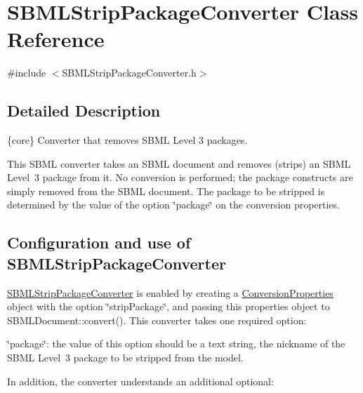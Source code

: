 \hypertarget{class_s_b_m_l_strip_package_converter}{}\section{S\+B\+M\+L\+Strip\+Package\+Converter Class Reference}
\label{class_s_b_m_l_strip_package_converter}


{\ttfamily \#include $<$S\+B\+M\+L\+Strip\+Package\+Converter.\+h$>$}



\subsection{Detailed Description}
\{core\} Converter that removes S\+B\+ML Level 3 packages.



This S\+B\+ML converter takes an S\+B\+ML document and removes (strips) an S\+B\+ML Level~3 package from it. No conversion is performed; the package constructs are simply removed from the S\+B\+ML document. The package to be stripped is determined by the value of the option {\ttfamily \char`\"{}package\char`\"{}} on the conversion properties.\hypertarget{class_s_b_m_l_strip_package_converter_SBMLStripPackageConverter-usage}{}\subsection{Configuration and use of S\+B\+M\+L\+Strip\+Package\+Converter}\label{class_s_b_m_l_strip_package_converter_SBMLStripPackageConverter-usage}
\hyperlink{class_s_b_m_l_strip_package_converter}{S\+B\+M\+L\+Strip\+Package\+Converter} is enabled by creating a \hyperlink{class_conversion_properties}{Conversion\+Properties} object with the option {\ttfamily \char`\"{}strip\+Package\char`\"{}}, and passing this properties object to S\+B\+M\+L\+Document\+::convert(). This converter takes one required option\+:

\begin{DoxyItemize}
\item {\ttfamily \char`\"{}package\char`\"{}}\+: the value of this option should be a text string, the nickname of the S\+B\+ML Level~3 package to be stripped from the model.\end{DoxyItemize}
In addition, the converter understands an additional optional\+:

